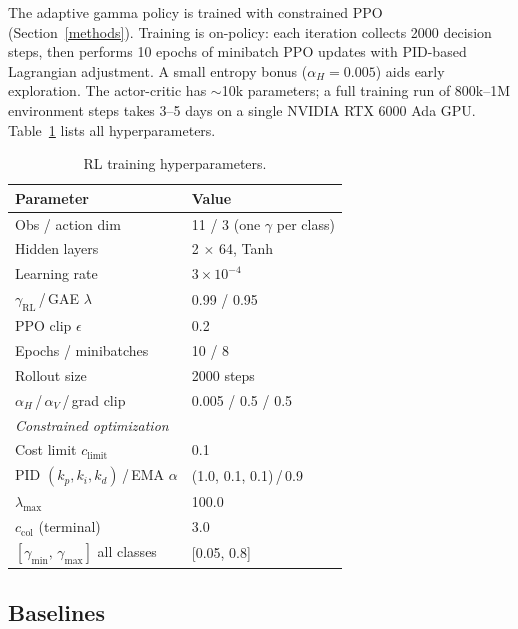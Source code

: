 The adaptive gamma policy is trained with constrained PPO (Section~\ref{methods}). Training is on-policy: each iteration collects 2000 decision steps, then performs 10 epochs of minibatch PPO updates with PID-based Lagrangian adjustment. A small entropy bonus ($\alpha_H{=}0.005$) aids early exploration. The actor-critic has $\sim$10k parameters; a full training run of 800k--1M environment steps takes 3--5 days on a single NVIDIA RTX 6000 Ada GPU. Table~\ref{tab:rl-params} lists all hyperparameters.

\begin{table}[!htbp]
\centering
\caption{RL training hyperparameters.}
\label{tab:rl-params}
{\scriptsize
\setlength{\tabcolsep}{5.5pt}
\begin{tabular}{ll}
\toprule
\textbf{Parameter} & \textbf{Value} \\
\midrule
Obs / action dim              & 11 / 3 (one $\gamma$ per class) \\
Hidden layers                 & 2 $\times$ 64, Tanh \\
Learning rate                 & $3 \times 10^{-4}$ \\
$\gamma_{\text{RL}}$\,/\,GAE $\lambda$ & 0.99 / 0.95 \\
PPO clip $\epsilon$           & 0.2 \\
Epochs / minibatches          & 10 / 8 \\
Rollout size                  & 2000 steps \\
$\alpha_H$\,/\,$\alpha_V$\,/\,grad clip & 0.005 / 0.5 / 0.5 \\
\midrule
\multicolumn{2}{l}{\textit{Constrained optimization}} \\
\midrule
Cost limit $c_{\text{limit}}$   & 0.1 \\
PID $(k_p, k_i, k_d)$\,/\,EMA $\alpha$ & (1.0, 0.1, 0.1)\,/\,0.9 \\
$\lambda_{\max}$              & 100.0 \\
$c_{\text{col}}$ (terminal)   & 3.0 \\
$[\gamma_{\min},\,\gamma_{\max}]$ all classes & [0.05, 0.8] \\
\bottomrule
\end{tabular} }
\end{table}

\subsection{Baselines}

